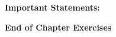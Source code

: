 \documentclass[11pt,largemargins]{homework}
\begin{document}
\maketitle

\textbf{\large{Important Statements:}}


\textbf{\large{End of Chapter Exercises}}

\question

\question

\question

\question

\question

\question

\question

\question

\question

\question

\question

\question

\question

\question

\question

\question

\question

\question

\question

\question

\question

\question

\question

\question

\question

\question

\question

\question

\question

\question

\question

\question

\question
\end{document}
